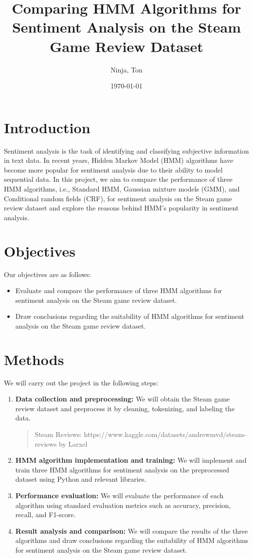 \documentclass{article}
\title{Comparing HMM Algorithms for Sentiment Analysis on the Steam Game Review Dataset}
\author{Ninja, Ton}
\date{\today}
\begin{document}
\maketitle

\section{Introduction}
Sentiment analysis is the task of identifying and classifying subjective information in text data. In recent years, Hidden Markov Model (HMM) algorithms have become more popular for sentiment analysis due to their ability to model sequential data. In this project, we aim to compare the performance of three HMM algorithms, i.e., Standard HMM, Gaussian mixture models (GMM), and Conditional random fields (CRF), for sentiment analysis on the Steam game review dataset and explore the reasons behind HMM's popularity in sentiment analysis.

\section{Objectives}
Our objectives are as follows:
\begin{itemize}
\item Evaluate and compare the performance of three HMM algorithms for sentiment analysis on the Steam game review dataset.
\item Draw conclusions regarding the suitability of HMM algorithms for sentiment analysis on the Steam game review dataset.
\end{itemize}

\section{Methods}
We will carry out the project in the following steps:
\begin{enumerate}
\item \textbf{Data collection and preprocessing:} We will obtain the Steam game review dataset and preprocess it by cleaning, tokenizing, and labeling the data.
\begin{quote}
Steam Reviews: https://www.kaggle.com/datasets/andrewmvd/steam-reviews by Larxel
\end{quote}
\item \textbf{HMM algorithm implementation and training:} We will implement and train three HMM algorithms for sentiment analysis on the preprocessed dataset using Python and relevant libraries.
\item \textbf{Performance evaluation:} We will evaluate the performance of each algorithm using standard evaluation metrics such as accuracy, precision, recall, and F1-score.
\item \textbf{Result analysis and comparison:} We will compare the results of the three algorithms and draw conclusions regarding the suitability of HMM algorithms for sentiment analysis on the Steam game review dataset.
\end{enumerate}
\end{document}
